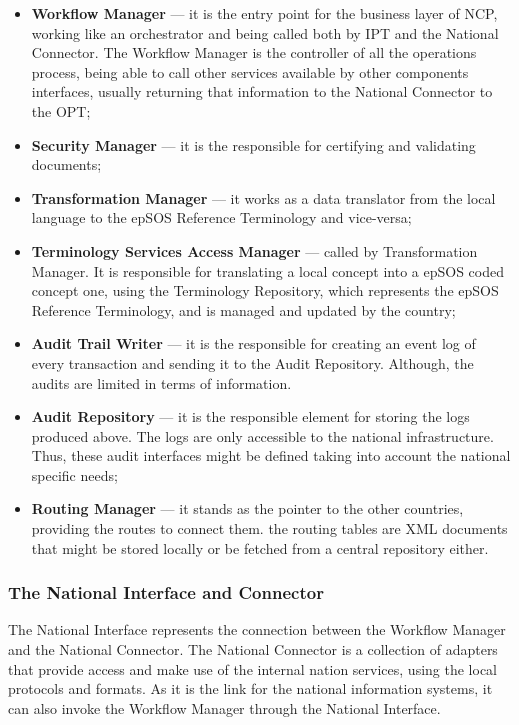 \begin{itemize}
\item \textbf{Workflow Manager} --- it is the entry point for the business layer of NCP, working like an orchestrator and being called both by IPT and the National Connector. The Workflow Manager is the controller of all the operations process, being able to call other services available by other components interfaces, usually returning that information to the National Connector to the OPT;
\item \textbf{Security Manager} --- it is the responsible for certifying and validating documents;
\item \textbf{Transformation Manager} --- it works as a data translator from the local language to the epSOS Reference Terminology and vice-versa;
\item \textbf{Terminology Services Access Manager} --- called by Transformation Manager. It is responsible for translating a local concept into a epSOS coded concept one, using the Terminology Repository, which represents the epSOS Reference Terminology, and is managed and updated by the country;
\item \textbf{Audit Trail Writer} --- it is the responsible for creating an event log of every transaction and sending it to the Audit Repository. Although, the audits are limited in terms of information.
\item \textbf{Audit Repository} --- it is the responsible element for storing the logs produced above. The logs are only accessible to the national infrastructure. Thus, these audit interfaces might be defined taking into account the national specific needs;
\item \textbf{Routing Manager} --- it stands as the pointer to the other countries, providing the routes to connect them. the routing tables are XML documents that might be stored locally or be fetched from a central repository either. 
\end{itemize}

\subsubsection{The National Interface and Connector}
The National Interface represents the connection between the Workflow Manager and the National Connector. The National Connector is a collection of adapters that provide access and make use of the internal nation services, using the local protocols and formats. As it is the link for the national information systems, it can also invoke the Workflow Manager through the National Interface.


